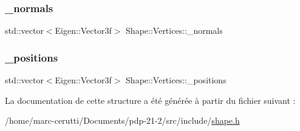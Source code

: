 \mbox{\label{struct_shape_1_1_vertices_aa258b760267bf6e5b316ac6ec11a2ea3}} 
\subsubsection{\texorpdfstring{\+\_\+normals}{\_normals}}
{\footnotesize\ttfamily std\+::vector$<$Eigen\+::\+Vector3f$>$ Shape\+::\+Vertices\+::\+\_\+normals}

\mbox{\label{struct_shape_1_1_vertices_aef6a4c183b595cffa5e890e3ba06c64d}} 
\subsubsection{\texorpdfstring{\+\_\+positions}{\_positions}}
{\footnotesize\ttfamily std\+::vector$<$Eigen\+::\+Vector3f$>$ Shape\+::\+Vertices\+::\+\_\+positions}



La documentation de cette structure a été générée à partir du fichier suivant \+:\begin{DoxyCompactItemize}
\item 
/home/marc-\/cerutti/\+Documents/pdp-\/21-\/2/src/include/\hyperlink{shape_8h}{shape.\+h}\end{DoxyCompactItemize}

